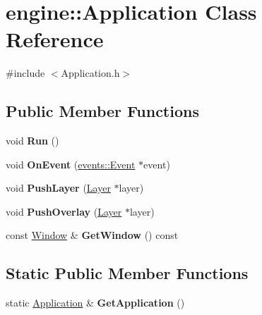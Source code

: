 \hypertarget{classengine_1_1Application}{}\section{engine\+:\+:Application Class Reference}
\label{classengine_1_1Application}


{\ttfamily \#include $<$Application.\+h$>$}

\subsection*{Public Member Functions}
\begin{DoxyCompactItemize}
\item 
\mbox{\label{classengine_1_1Application_a4dcdf08d920f7f63013a25cb1e80438b}} 
void {\bfseries Run} ()
\item 
\mbox{\label{classengine_1_1Application_a093e14152fc1eda1b5eba682a2b4afd9}} 
void {\bfseries On\+Event} (\hyperlink{classengine_1_1events_1_1Event}{events\+::\+Event} $\ast$event)
\item 
\mbox{\label{classengine_1_1Application_adb129a86a6cdbd80b25094d08605d213}} 
void {\bfseries Push\+Layer} (\hyperlink{classengine_1_1Layer}{Layer} $\ast$layer)
\item 
\mbox{\label{classengine_1_1Application_a00041c455b5699665d21662be95abd85}} 
void {\bfseries Push\+Overlay} (\hyperlink{classengine_1_1Layer}{Layer} $\ast$layer)
\item 
\mbox{\label{classengine_1_1Application_a0c66a3ff294bcc497bb2e8eb7330124c}} 
const \hyperlink{classengine_1_1Window}{Window} \& {\bfseries Get\+Window} () const
\end{DoxyCompactItemize}
\subsection*{Static Public Member Functions}
\begin{DoxyCompactItemize}
\item 
\mbox{\label{classengine_1_1Application_a639cdab87d3c5a14d0a9e9203d6c7c97}} 
static \hyperlink{classengine_1_1Application}{Application} \& {\bfseries Get\+Application} ()
\end{DoxyCompactItemize}


